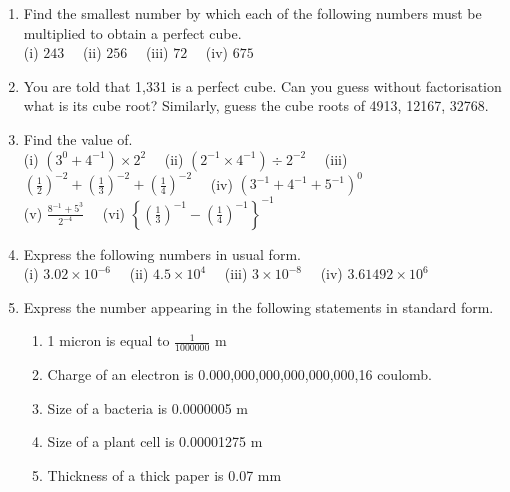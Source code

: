 \documentclass[a4paper,leqno,12pt]{amsart}
\begin{document}
\begin{enumerate}
\item Find the smallest number by which each of the following numbers must be multiplied
to obtain a perfect cube.\\
(i) $243 \quad$ (ii) $256 \quad$ (iii) $72 \quad$ (iv) $675$

\item You are told that 1,331 is a perfect cube. Can you guess without factorisation what
is its cube root? Similarly, guess the cube roots of 4913, 12167, 32768.

\item Find the value of.\\
(i) $(3^0  + 4^{-1}) \times 2^2 \quad $ (ii) $(2^{-1} \times 4^{-1}) \div 2^{-2} \quad$ (iii) $\left(\frac{1}{2} \right)^{-2} + \left(\frac{1}{3} \right)^{-2} + \left(\frac{1}{4} \right)^{-2} \quad$ (iv) $(3^{-1} + 4^{-1} + 5^{-1})^0$\\
(v) $\frac{8^{-1} + 5^3}{2^{-4}} \quad$ (vi) $\left\{\left(\frac{1}{3}\right)^{-1} -\left(\frac{1}{4}\right)^{-1} \right\}^{-1}$

\item Express the following numbers in usual form.\\
(i) $3.02 \times 10^{-6} \quad$ (ii) $4.5 \times 10^4 \quad$ (iii) $3 \times 10^{-8} \quad $ (iv) $3.61492 \times 10^6$

\item Express the number appearing in the following statements in standard form.\\
\begin{enumerate}
 \item 1 micron is equal to $\frac{1}{1000000}$ m
 \item Charge of an electron is 0.000,000,000,000,000,000,16 coulomb.
 \item Size of a bacteria is 0.0000005 m
 \item Size of a plant cell is 0.00001275 m
 \item Thickness of a thick paper is 0.07 mm
\end{enumerate}

\end{enumerate}


\end{document}
